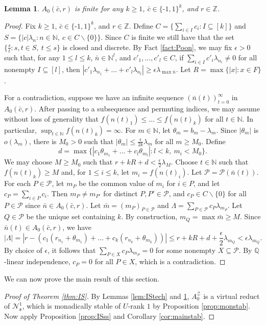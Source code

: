 \documentclass{amsart}
\def\seq{\subseteq}
\newcommand{\nv}{\text{-}}
\newcommand{\cbar}{\bar{c}}
\newcommand{\mbar}{\bar{m}}
\newcommand{\nbar}{\bar{n}}
\newcommand{\ms}{\mathfrak{s}}
\newcommand{\cN}{\mathcal{N}}
\newcommand{\cP}{\mathcal{P}}
\newcommand{\cZ}{\mathcal{Z}}
\def\N{\mathbb N}
\def\Q{\mathbb Q}
\def\Z{\mathbb Z}
\newtheorem{lemma}[theorem]{Lemma}
\theoremstyle{definition}
\begin{document}
\begin{lemma}\label{lem:ISfin}
$A_0(\cbar,r)$ is finite for any $k\geq 1$, $\cbar\in\{\nv 1,1\}^k$, and $r\in\Z$.
\end{lemma}
\begin{proof}
Fix $k\geq 1$, $\cbar\in\{\nv 1,1\}^k$, and $r\in\Z$. Define  $C=\{\sum_{i\in I}c_i:I\seq [k]\}$ and $S=\{|c|\lambda_n:n\in\N,~c\in C\backslash\{0\}\}$. Since $C$ is finite we still have that the set $\{\frac{s}{t}:s,t\in S,~t\leq s\}$ is closed and discrete. By Fact \ref{fact:Poon}, we may fix $\epsilon>0$ such that, for any $1\leq l\leq k$, $\nbar\in\N^l$, and $c'_1,\ldots,c'_l\in C$, if $\sum_{i\in I}c'_i\lambda_{n_i}\neq 0$ for all nonempty $I\seq[l]$, then $|c'_1\lambda_{n_1}+\ldots+c'_l\lambda_{n_l}|\geq \epsilon\lambda_{\max\nbar}$.  Let $R=\max\{|x|:x\in F\}$.

For a contradiction, suppose we have an infinite sequence $(\nbar(t))_{t=0}^\infty$ in $A_0(\cbar,r)$. After passing to a subsequence and permuting indices, we may assume without loss of generality that $f(n(t)_1)\leq\ldots\leq f(n(t)_k)$ for all $t\in\N$. In particular, $\sup_{t\in\N}f(n(t)_k)=\infty$. For $m\in\N$, let $\theta_m=b_m-\lambda_m$. Since $|\theta_m|$ is $o(\lambda_m)$, there is $M_0>0$ such that $|\theta_m|\leq \frac{\epsilon}{2k}\lambda_m$ for all $m\geq M_0$. Define
\[
d=\max\{|c_1\theta_{m_1}+\ldots+c_l\theta_{m_l}|:l<k,~m_i<M_0\}.
\]
We may choose $M\geq M_0$ such that $r+kR+d<\frac{\epsilon}{2}\lambda_M$. Choose $t\in\N$ such that $f(n(t)_k)\geq M$ and, for $1\leq i\leq k$, let $m_i=f(n(t)_i)$. Let $\cP=\cP(\nbar(t))$. For each $P\in\cP$, let $m_P$ be the common value of $m_i$ for $i\in P$, and let $c_P=\sum_{i\in P}c_i$. Then $m_P\neq m_{P'}$ for distinct $P,P'\in\cP$, and $c_P\in C\backslash\{0\}$ for all $P\in\cP$ since $\nbar\in A_0(\cbar,r)$. Let $\mbar=(m_P)_{P\in\cP}$ and $\Lambda=\sum_{P\in \cP}c_P\lambda_{m_P}$. Let $Q\in\cP$ be the unique set containing $k$. By construction, $m_Q=\max\mbar\geq  M$. Since $\nbar(t)\in A_0(\cbar,r)$, we have
\[
|\Lambda|=|r-(c_1(r_{n_1}+\theta_{m_1})+\ldots+c_k(r_{n_k}+\theta_{m_k}))|\leq r+kR+d+\textstyle\frac{\epsilon}{2}\lambda_{m_Q}<\epsilon\lambda_{m_Q}.
\]
By choice of $\epsilon$, it follows that $\sum_{P\in X}c_P\lambda_{m_P}=0$ for some nonempty $X\seq\cP$. By $\Q$-linear independence, $c_P=0$ for all $P\in X$, which is a contradiction.
\end{proof}

We can now prove the main result of this section.

\begin{proof}[Proof of Theorem \ref{thm:IS}]
By Lemmas \ref{lem:IStech} and \ref{lem:ISfin}, $A^{\cZ}_0$ is a virtual reduct of $\cN^1_{\ms}$, which is monadically stable of $U$-rank $1$ by Proposition \ref{prop:monstab}. Now apply Proposition \ref{prop:ISss} and Corollary \ref{cor:mainstab}.
\end{proof}
\end{document}
